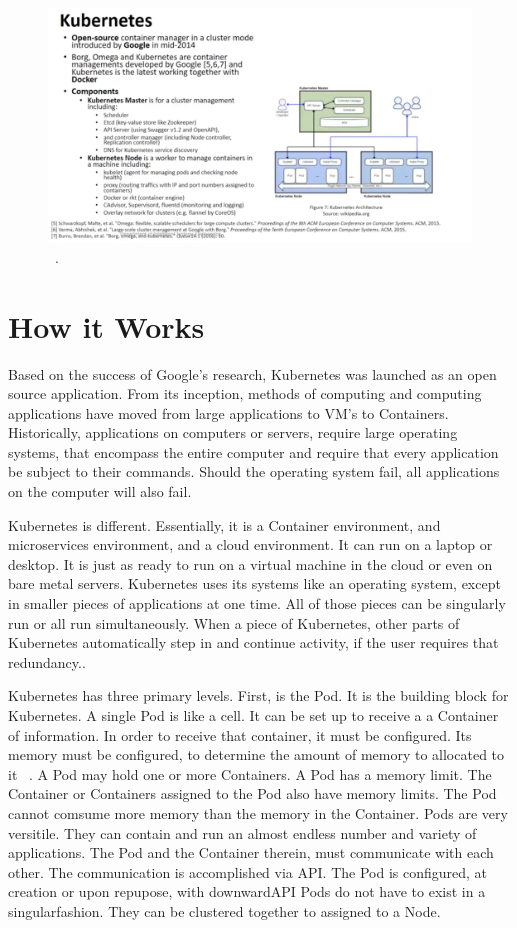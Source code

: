 \begin{figure}[!ht]
\centering\includegraphics[width=\columnwidth]{images/kubernetes.png}~\cite{definition}.
\end{figure}

\section{How it Works}

 
Based on the success of Google's research, Kubernetes was launched as
an open source application.  From its inception, methods of computing 
and computing applications have moved from large applications to VM's
to Containers.  Historically, applications on computers or servers, require
large operating systems, that encompass the entire computer and
require that every application be subject to their commands.  Should
the operating system fail, all applications on the computer will also
fail.   

Kubernetes is different.  Essentially, it is a Container environment,
and microservices environment, and a cloud environment.  It can run on
a laptop or desktop.  It is just as ready to run on a virtual machine
in the cloud or even on bare metal servers.  Kubernetes uses its
systems like an operating system, except in smaller pieces of
applications at one time.  All of those pieces can be singularly run
or all run simultaneously.  When a piece of Kubernetes, other parts of
Kubernetes automatically step in and continue activity, if the user
requires that redundancy.\cite{concept}.

Kubernetes has three primary levels.  First, is the Pod.  It is the
building block for Kubernetes.  A single Pod is like a cell.  It can
be set up to receive a a Container of information.  In order to
receive that container, it must be configured.  Its memory must be
configured, to determine the amount of memory to allocated to it
~\cite{pods}.  A Pod may hold one or more Containers.  A Pod has a
memory limit.  The Container or Containers assigned to the Pod also
have memory limits.  The Pod cannot comsume more memory than the
memory in the Container.  Pods are very versitile.  They can contain
and run an almost endless number and variety of applications.  The Pod
and the Container therein, must communicate with each other.  The
communication is accomplished via API.  The Pod is configured, at
creation or upon repupose, with downwardAPI Pods do not have to exist
in a singularfashion.  They can be clustered together to assigned to a Node.  

